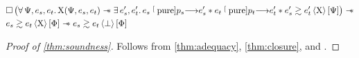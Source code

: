 \begin{lemma} \label{thm:closure}
    \begin{align*}
            &
            \iPersistent \left(
                \forall \iPredTwo, \datalangExpr_s, \datalangExpr_t \ldotp
                \iProt (\iPredTwo, \datalangExpr_s, \datalangExpr_t) \iWand
                \exists \datalangExpr_s', \datalangExpr_t' \ldotp
                \datalangExpr_s \pureStep{\datalangProg_s} \datalangExpr_s' \iSep
                \datalangExpr_t \pureStep{\datalangProg_t} \datalangExpr_t' \iSep
                \iSim[\iProt]{\iPredTwo}{\datalangExpr_s'}{\datalangExpr_t'}
            \right) \iWand
        \\
            &
            \iSim[\iProt]{\iPred}{\datalangExpr_s}{\datalangExpr_t} \iWand
            \iSim[\bot]{\iPred}{\datalangExpr_s}{\datalangExpr_t}
    \end{align*}
\end{lemma}

\begin{proof}[Proof of \cref{thm:soundness}]
    Follows from \cref{thm:adequacy}, \cref{thm:closure},  and .
\end{proof}




